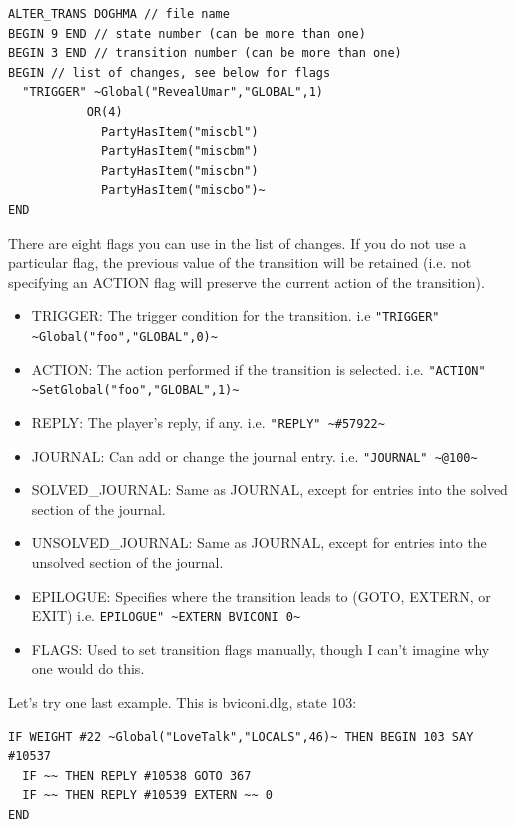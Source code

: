 \documentclass{article}
\begin{document}
\begin{verbatim}
ALTER_TRANS DOGHMA // file name
BEGIN 9 END // state number (can be more than one)
BEGIN 3 END // transition number (can be more than one)
BEGIN // list of changes, see below for flags
  "TRIGGER" ~Global("RevealUmar","GLOBAL",1)
           OR(4)
             PartyHasItem("miscbl")
             PartyHasItem("miscbm")
             PartyHasItem("miscbn")
             PartyHasItem("miscbo")~
END
\end{verbatim}


There are eight flags you can use in the list of changes. If you do not use a particular flag, the previous value of the transition will be retained (i.e. not specifying an ACTION flag will preserve the current action of the transition).

\begin{itemize}
\item TRIGGER: The trigger condition for the transition.
 i.e \verb+"TRIGGER" ~Global("foo","GLOBAL",0)~+

\item ACTION: The action performed if the transition is selected.
  i.e. \verb+"ACTION" ~SetGlobal("foo","GLOBAL",1)~+

\item REPLY: The player's reply, if any.
  i.e. \verb+"REPLY" ~#57922~+

\item JOURNAL: Can add or change the journal entry.
  i.e. \verb+"JOURNAL" ~@100~+

\item SOLVED_JOURNAL: Same as JOURNAL, except for entries into the solved section of the journal.

\item UNSOLVED_JOURNAL: Same as JOURNAL, except for entries into the unsolved section of the journal.

\item EPILOGUE: Specifies where the transition leads to (GOTO, EXTERN, or EXIT)
  i.e. \verb+EPILOGUE" ~EXTERN BVICONI 0~+

\item FLAGS: Used to set transition flags manually, though I can't imagine why one would do this.
\end{itemize}

Let's try one last example. This is bviconi.dlg, state 103:

\begin{verbatim}
IF WEIGHT #22 ~Global("LoveTalk","LOCALS",46)~ THEN BEGIN 103 SAY #10537
  IF ~~ THEN REPLY #10538 GOTO 367
  IF ~~ THEN REPLY #10539 EXTERN ~~ 0
END
\end{verbatim}
\end{document}
